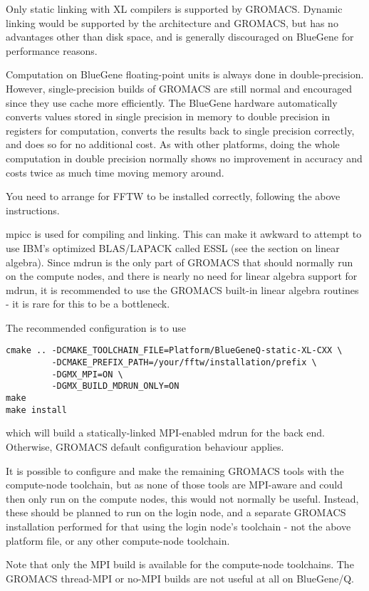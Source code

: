 \documentclass{article}[12pt,a4paper,twoside]
\newcommand{\gromacs}{GROMACS}
\newcommand{\mpi}{MPI}
\begin{document}
\begin{enumerate}
Only static linking with XL compilers is supported by \gromacs{}. Dynamic
linking would be supported by the architecture and \gromacs{}, but has no
advantages other than disk space, and is generally discouraged on
BlueGene for performance reasons.

Computation on BlueGene floating-point units is always done in
double-precision. However, single-precision builds of \gromacs{} are
still normal and encouraged since they use cache more efficiently. 
The BlueGene hardware automatically
converts values stored in single precision in memory to double
precision in registers for computation, converts the results back to
single precision correctly, and does so for no additional cost. As
with other platforms, doing the whole computation in double precision
normally shows no improvement in accuracy and costs twice as much time
moving memory around.

You need to arrange for FFTW to be installed correctly, following the
above instructions.

mpicc is used for compiling and linking. This can make it awkward to
attempt to use IBM's optimized BLAS/LAPACK called ESSL (see the
section on linear algebra). Since mdrun is the only part of \gromacs{}
that should normally run on the compute nodes, and there is nearly no
need for linear algebra support for mdrun, it is recommended to use
the \gromacs{} built-in linear algebra routines - it is rare for this
to be a bottleneck.

The recommended configuration is to use
\begin{verbatim}
cmake .. -DCMAKE_TOOLCHAIN_FILE=Platform/BlueGeneQ-static-XL-CXX \
         -DCMAKE_PREFIX_PATH=/your/fftw/installation/prefix \
         -DGMX_MPI=ON \
         -DGMX_BUILD_MDRUN_ONLY=ON
make
make install
\end{verbatim}
which will build a statically-linked \mpi{}-enabled mdrun for the back
end. Otherwise, GROMACS default configuration behaviour applies.

It is possible to configure and make the remaining \gromacs{} tools
with the compute-node toolchain, but as none of those tools are
\mpi{}-aware and could then only run on the compute nodes, this
would not normally be useful. Instead, these should be planned
to run on the login node, and a separate \gromacs{} installation
performed for that using the login node's toolchain - not the
above platform file, or any other compute-node toolchain.

Note that only the MPI build is available for the compute-node
toolchains. The GROMACS thread-MPI or no-MPI builds are not useful at
all on BlueGene/Q.


\end{enumerate}
\end{document}
